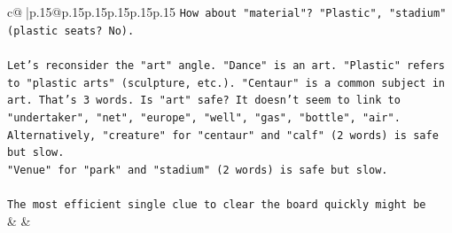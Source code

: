 \documentclass{article}
\begin{document}
{\begin{supertabular}{c@{$\;$}|p{.15\linewidth}@{}p{.15\linewidth}p{.15\linewidth}p{.15\linewidth}p{.15\linewidth}p{.15\linewidth}}
{{{\texttt{How about "material"? "Plastic", "stadium" (plastic seats? No).} \\
\\ 
\texttt{Let's reconsider the "art" angle. "Dance" is an art. "Plastic" refers to "plastic arts" (sculpture, etc.). "Centaur" is a common subject in art. That's 3 words. Is "art" safe? It doesn't seem to link to "undertaker", "net", "europe", "well", "gas", "bottle", "air".} \\
\texttt{Alternatively, "creature" for "centaur" and "calf" (2 words) is safe but slow.} \\
\texttt{"Venue" for "park" and "stadium" (2 words) is safe but slow.} \\
\\ 
\texttt{The most efficient single clue to clear the board quickly might be} \\
            }
        }
    }
    & & \\ \\

\end{supertabular}
}
\end{document}
